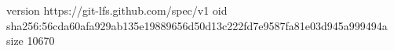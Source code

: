 version https://git-lfs.github.com/spec/v1
oid sha256:56cda60afa929ab135e19889656d50d13c222fd7e9587fa81e03d945a999494a
size 10670
